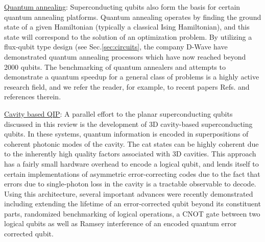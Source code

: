 \documentclass[aip,apr,twocolumn,showpacs,superscriptaddress,groupedaddress,nofootinbib,reprint]{revtex4-1}  %
\begin{document}
\underline{Quantum annealing}: Superconducting qubits also form the basis for certain quantum annealing platforms\cite{Farhi2000,Farhi2001}. Quantum annealing operates by finding the ground state of a given Hamiltonian (typically a classical Ising Hamiltonian), and this state will correspond to the solution of an optimization problem. By utilizing a flux-qubit type design (see Sec.\ref{sec:circuits}, the company D-Wave have demonstrated quantum annealing processors\cite{Johnson2011} which have now reached beyond 2000 qubits\cite{DWaveSite}. The benchmarking of quantum annealers and attempts to demonstrate a quantum speedup for a general class of problems is a highly active research field, and we refer the reader, for example, to recent papers Refs.  and references therein.

\underline{Cavity based QIP}: A parallel effort to the planar superconducting qubits discussed in this review is the development of 3D cavity-based superconducting qubits. In these systems, quantum information is encoded in superpositions of coherent photonic modes of the cavity\cite{Wang2016}. The cat states can be highly coherent due to the inherently high quality factors associated with 3D cavities\cite{Reagor2013,Axline2016,Pfaff2017}. This approach has a fairly small hardware overhead to encode a logical qubit\cite{Heeres2017}, and lends itself to certain implementations of asymmetric error-correcting codes due to the fact that errors due to single-photon loss in the cavity is a tractable observable to decode. Using this architecture, several important advances were recently demonstrated including extending the lifetime of an error-corrected qubit beyond its constituent parts\cite{Ofek2016}, randomized benchmarking of logical operations\cite{Heeres2017}, a \textsf{CNOT} gate between two logical qubits\cite{Rosenblum2018} as well as Ramsey interference of an encoded quantum error corrected qubit\cite{Hu2019}.
\end{document}
